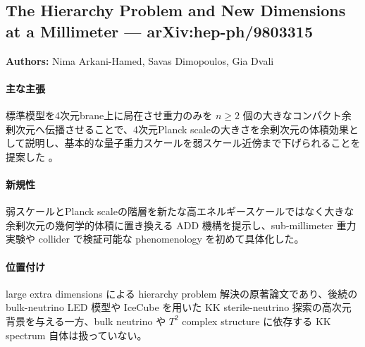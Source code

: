 \subsection{The Hierarchy Problem and New Dimensions at a Millimeter --- arXiv:hep-ph/9803315}

\textbf{Authors:} Nima Arkani-Hamed, Savas Dimopoulos, Gia Dvali

\paragraph{主な主張}
標準模型を4次元brane上に局在させ重力のみを $n\geq2$ 個の大きなコンパクト余剰次元へ伝播させることで、4次元Planck scaleの大きさを余剰次元の体積効果として説明し、基本的な量子重力スケールを弱スケール近傍まで下げられることを提案した \cite{ArkaniHamed:1998ADD}。

\paragraph{新規性}
弱スケールとPlanck scaleの階層を新たな高エネルギースケールではなく大きな余剰次元の幾何学的体積に置き換える ADD 機構を提示し、sub-millimeter 重力実験や collider で検証可能な phenomenology を初めて具体化した。

\paragraph{位置付け}
large extra dimensions による hierarchy problem 解決の原著論文であり、後続の bulk-neutrino LED 模型や IceCube を用いた KK sterile-neutrino 探索の高次元背景を与える一方、bulk neutrino や $T^2$ complex structure に依存する KK spectrum 自体は扱っていない。
